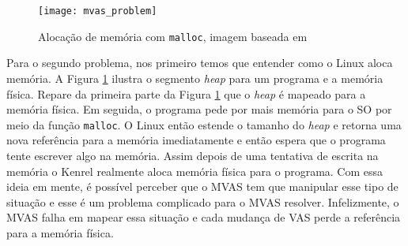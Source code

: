 \begin{figure}[!h]
  \centering
  \texttt{[image: mvas\_problem]}
  \caption{Alocação de memória com \texttt{malloc}, imagem baseada em \citep{kernel_malloc}}
  \label{fig:malloc_linux}
\end{figure}

Para o segundo problema, nos primeiro temos que entender como o Linux aloca
memória. A Figura \ref{fig:malloc_linux} ilustra o segmento \emph{heap} para um
programa e a memória física. Repare da primeira parte da Figura
\ref{fig:malloc_linux} que o \emph{heap} é mapeado para a memória física. Em
seguida, o programa pede por mais memória para o SO por meio da função
\texttt{malloc}. O Linux então estende o tamanho do \emph{heap} e retorna uma
nova referência para a memória imediatamente e então espera que o programa
tente escrever algo na memória. Assim depois de uma tentativa de escrita na
memória o Kenrel realmente aloca memória física para o programa. Com essa ideia
em mente, é possível perceber que o MVAS tem que manipular esse tipo de
situação e esse é um problema complicado para o MVAS resolver. Infelizmente, o
MVAS falha em mapear essa situação e cada mudança de VAS perde a referência
para a memória física.

